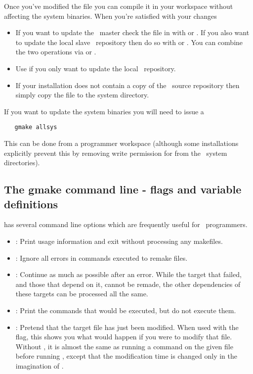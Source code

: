 \noindent
Once you've modified the file you can compile it in your workspace without
affecting the system binaries.  When you're satisfied with your changes

\begin{itemize}
\item
   If you want to update the \aipspp\ master check the file in with
    or .  If you also want to update the local slave
   \rcs\ repository then do so with  or .  You can
   combine the two operations via  or .
\item
   Use  if you only want to update the local \rcs\ repository.
\item
   If your installation does not contain a copy of the \rcs\ source repository
   then simply copy the file to the system directory.
\end{itemize}

\noindent
If you want to update the system binaries you will need to issue a

\begin{verbatim}
   gmake allsys
\end{verbatim}

\noindent
This can be done from a programmer workspace (although some installations
explicitly prevent this by removing write permission for  from
the \aipspp\ system directories).

\subsection*{The gmake command line - flags and variable definitions}

 has several command line options which are frequently useful
for \aipspp\ programmers.

\begin{itemize}
\item
   : Print usage information and exit without processing any
   makefiles.
\item
   : Ignore all  errors  in  commands  executed  to  remake files.
\item
   : Continue as much as possible after an error.   While the target
   that failed, and those that depend on it, cannot be remade, the other
   dependencies of these targets can be processed all the same.
\item
   : Print the commands that would be executed, but do not execute
   them.
\item
   : Pretend that the target file has just been modified.  When used
   with the  flag, this shows you what would happen if you were to
   modify that file.  Without , it is almost the same as running a
    command on the given file before running ,
   except that the modification time is changed only in the imagination of
   .
\end{itemize}

